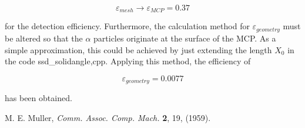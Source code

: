 \documentclass{article}
\begin{document}
$$
\varepsilon_{mesh} \rightarrow \varepsilon_{MCP} = 0.37
$$

for the detection efficiency. Furthermore, the calculation method for $\varepsilon_{geometry}$ must be altered so that the $\alpha$ particles originate at the surface of the MCP. As a simple approximation, this could be achieved by just extending the length $X_0$ in the code ssd\_solidangle,cpp. Applying this method, the efficiency of 

$$
\varepsilon_{geometry} = 0.0077
$$

has been obtained.





\begin{thebibliography}{9}
	 M. E. Muller, {\it Comm. Assoc. Comp. Mach.} {\bf 2}, 19, (1959).
\end{thebibliography}
\end{document}

